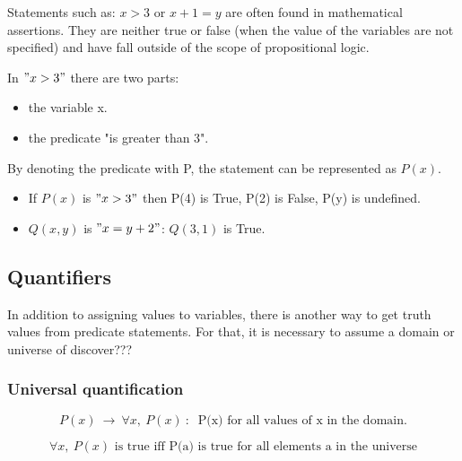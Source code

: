 \documentclass[12pt, a4paper]{book}
\begin{document}
Statements such as: $x>3$ or $x+1=y$ are often found in mathematical assertions. They are neither true or false (when the value of the variables are not specified) and have fall outside of the scope of propositional logic.

In $"x>3"$ there are two parts:
\begin{itemize}
    \item the variable x.
    \item the predicate "is greater than 3".
\end{itemize}

By denoting the predicate with P, the statement can be represented as $P(x)$.

\begin{exmp}
    \begin{itemize}
        \item If $P(x)$ is $"x>3"$ then P(4) is True, P(2) is False, P(y) is undefined.
        \item $Q(x,y)$ is $"x=y+2"$: $Q(3,1)$ is True.
    \end{itemize}
\end{exmp}

\subsection*{Quantifiers}

In addition to assigning values to variables, there is another way to get truth values from predicate statements. For that, it is necessary to assume a domain or universe of discover???

\subsubsection*{Universal quantification}

$$P(x) \ \rightarrow \ \forall x, \ P(x) \ : \ \text{ P(x) for all values of x in the domain}.$$

$$\forall x, \ P(x) \text{ is true iff P(a) is true for all elements a in the universe}$$
\end{document}
